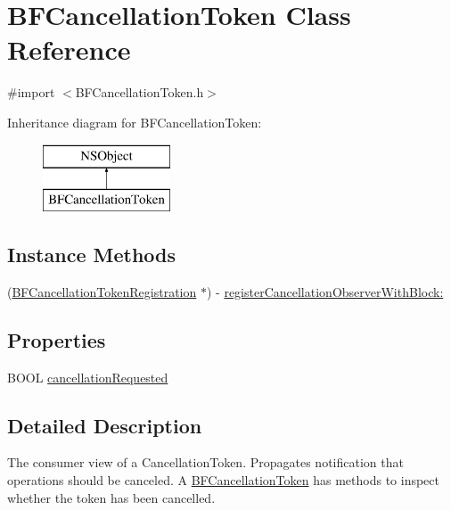 \hypertarget{interface_b_f_cancellation_token}{}\section{B\+F\+Cancellation\+Token Class Reference}
\label{interface_b_f_cancellation_token}


{\ttfamily \#import $<$B\+F\+Cancellation\+Token.\+h$>$}

Inheritance diagram for B\+F\+Cancellation\+Token\+:\begin{figure}[H]
\begin{center}
\leavevmode
\includegraphics[height=2.000000cm]{interface_b_f_cancellation_token}
\end{center}
\end{figure}
\subsection*{Instance Methods}
\begin{DoxyCompactItemize}
\item 
(\hyperlink{interface_b_f_cancellation_token_registration}{B\+F\+Cancellation\+Token\+Registration} $\ast$) -\/ \hyperlink{interface_b_f_cancellation_token_a4e0bfbca022aa0ab343b8f2a217d87ed}{register\+Cancellation\+Observer\+With\+Block\+:}
\end{DoxyCompactItemize}
\subsection*{Properties}
\begin{DoxyCompactItemize}
\item 
B\+O\+O\+L \hyperlink{interface_b_f_cancellation_token_a565a06cb4c105838f66495b5b79e1280}{cancellation\+Requested}
\end{DoxyCompactItemize}


\subsection{Detailed Description}
The consumer view of a Cancellation\+Token. Propagates notification that operations should be canceled. A \hyperlink{interface_b_f_cancellation_token}{B\+F\+Cancellation\+Token} has methods to inspect whether the token has been cancelled. 

